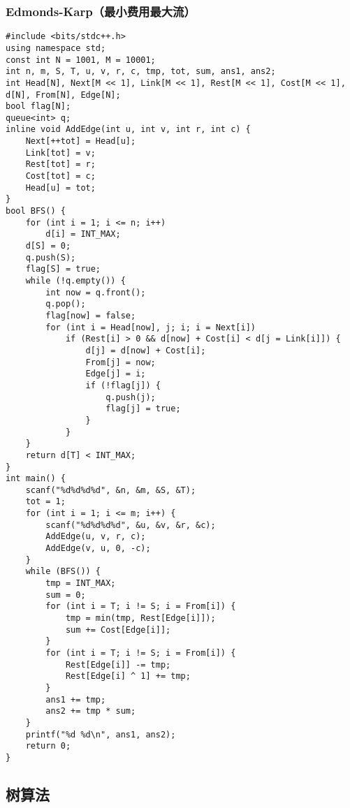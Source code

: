 ﻿\documentclass[a4paper]{article}
\begin{document}
\subsubsection{Edmonds-Karp（最小费用最大流）}
\begin{lstlisting}
#include <bits/stdc++.h>
using namespace std;
const int N = 1001, M = 10001;
int n, m, S, T, u, v, r, c, tmp, tot, sum, ans1, ans2;
int Head[N], Next[M << 1], Link[M << 1], Rest[M << 1], Cost[M << 1], d[N], From[N], Edge[N];
bool flag[N];
queue<int> q;
inline void AddEdge(int u, int v, int r, int c) {
    Next[++tot] = Head[u];
    Link[tot] = v;
    Rest[tot] = r;
    Cost[tot] = c;
    Head[u] = tot;
}
bool BFS() {
    for (int i = 1; i <= n; i++)
        d[i] = INT_MAX;
    d[S] = 0;
    q.push(S);
    flag[S] = true;
    while (!q.empty()) {
        int now = q.front();
        q.pop();
        flag[now] = false;
        for (int i = Head[now], j; i; i = Next[i])
            if (Rest[i] > 0 && d[now] + Cost[i] < d[j = Link[i]]) {
                d[j] = d[now] + Cost[i];
                From[j] = now;
                Edge[j] = i;
                if (!flag[j]) {
                    q.push(j);
                    flag[j] = true;
                }
            }
    }
    return d[T] < INT_MAX;
}
int main() {
    scanf("%d%d%d%d", &n, &m, &S, &T);
    tot = 1;
    for (int i = 1; i <= m; i++) {
        scanf("%d%d%d%d", &u, &v, &r, &c);
        AddEdge(u, v, r, c);
        AddEdge(v, u, 0, -c);
    }
    while (BFS()) {
        tmp = INT_MAX;
        sum = 0;
        for (int i = T; i != S; i = From[i]) {
            tmp = min(tmp, Rest[Edge[i]]);
            sum += Cost[Edge[i]];
        }
        for (int i = T; i != S; i = From[i]) {
            Rest[Edge[i]] -= tmp;
            Rest[Edge[i] ^ 1] += tmp;
        }
        ans1 += tmp;
        ans2 += tmp * sum;
    }
    printf("%d %d\n", ans1, ans2);
    return 0;
}
\end{lstlisting}
\subsection{树算法}
\end{document}

